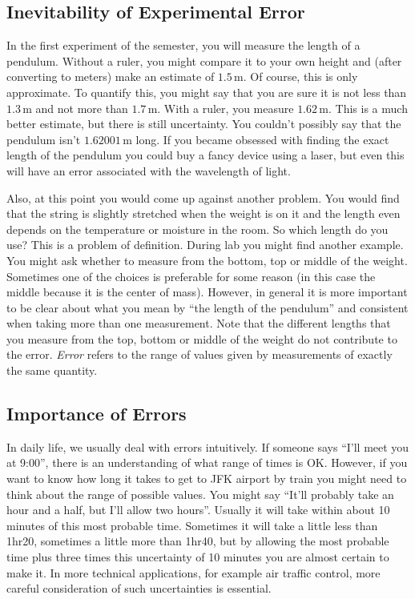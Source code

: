 \subsection{Inevitability of Experimental Error}

In the first experiment of the semester, you will measure the length of a pendulum. Without a ruler, you might compare it to your own height and (after converting to meters) make an estimate of $1.5\,\mathrm{m}$. Of course, this is only approximate. To quantify this, you might say that you are sure it is not less than $1.3\,\mathrm{m}$ and not more than $1.7\,\mathrm{m}$. With a ruler, you measure $1.62\,\mathrm{m}$. This is a much better estimate, but there is still uncertainty. You couldn't possibly say that the pendulum isn't $1.62001\,\mathrm{m}$ long. If you became obsessed with finding the exact length of the pendulum you could buy a fancy device using a laser, but even this will have an error associated with the wavelength of light.\myskip

Also, at this point you would come up against another problem. You would find that the string is slightly stretched when the weight is on it and the length even depends on the temperature or moisture in the room. So which length do you use? This is a problem of definition. During lab you might find another example. You might ask whether to measure from the bottom, top or middle of the weight. Sometimes one of the choices is preferable for some reason (in this case the middle because it is the center of mass). However, in general it is more important to be clear about what you mean by ``the length of the pendulum'' and consistent when taking more than one measurement. Note that the different lengths that you measure from the top, bottom or middle of the weight do not contribute to the error. \emph{Error} refers to the range of values given by measurements of exactly the same quantity.

\subsection{Importance of Errors}

In daily life, we usually deal with errors intuitively. If someone says ``I'll meet you at 9:00'', there is an understanding of what range of times is OK. However, if you want to know how long it takes to get to JFK airport by train you might need to think about the range of possible values. You might say ``It'll probably take an hour and a half, but I'll allow two hours''. Usually it will take within about 10 minutes of this most probable time. Sometimes it will take a little less than 1hr20, sometimes a little more than 1hr40, but by allowing the most probable time plus three times this uncertainty of 10 minutes you are almost certain to make it. In more technical applications, for example air traffic control, more careful consideration of such uncertainties is essential.\myskip

